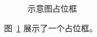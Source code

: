 \documentclass[12pt,a4paper]{ctexart} %
\begin{document}
\begin{figure}[htbp] %
  \centering %

  \fbox{\rule{0pt}{4cm}\rule{0.7\linewidth}{0pt}}


  \caption{示意图占位框} %
  \label{fig:demo} %
\end{figure}

图~\ref{fig:demo} 展示了一个占位框。 %
\end{document}
